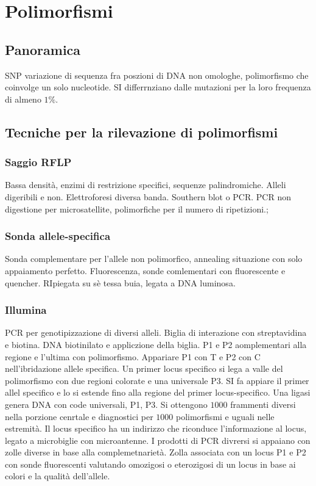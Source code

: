 \chapter{Polimorfismi}

\section{Panoramica}
SNP variazione di sequenza fra poszioni di DNA non omologhe, polimorfismo che coinvolge un solo nucleotide.
SI differrnziano dalle mutazioni per la loro frequenza di almeno $1\%$.

\section{Tecniche per la rilevazione di polimorfismi}

	\subsection{Saggio RFLP}
	Bassa densit\`a, enzimi di restrizione specifici, sequenze palindromiche.
	Alleli digeribili e non.
	Elettroforesi diversa banda.
	Southern blot o PCR.
	PCR non digestione per microsatellite, polimorfiche per il numero di ripetizioni.;

	\subsection{Sonda allele-specifica}
	Sonda complementare per l'allele non polimorfico, annealing situazione con solo appaiamento perfetto.
	Fluorescenza, sonde comlementari con fluorescente e quencher.
	RIpiegata su s\`e tessa buia, legata a DNA luminosa.

	\subsection{Illumina}
	PCR per genotipizzazione di diversi alleli.
	Biglia di interazione con streptavidina e biotina.
	DNA biotinilato e appliczione della biglia.
	P1 e P2 aomplementari alla regione e l'ultima con polimorfismo.
	Appariare P1 con T e P2 con C nell'ibridazione allele specifica.
	Un primer locus specifico si lega a valle del polimorfismo con due regioni colorate e una universale P3.
	SI fa appiare il primer allel specifico e lo si estende fino alla regione del primer locus-specifico.
	Una ligasi genera DNA con code universali, P1, P3.
	Si ottengono $1000$ frammenti diversi nella porzione cenrtale e diagnostici per $1000$ polimorfismi e uguali nelle estremit\`a.
	Il locus specifico ha un indirizzo che riconduce l'informazione al locus, legato a microbiglie con microantenne.
	I prodotti di PCR divrersi si appaiano con zolle diverse in base alla complemetnariet\`a.
	Zolla associata con un locus P1 e P2 con sonde fluorescenti valutando omozigosi o eterozigosi di un locus in base ai colori e la qualit\`a dell'allele.

